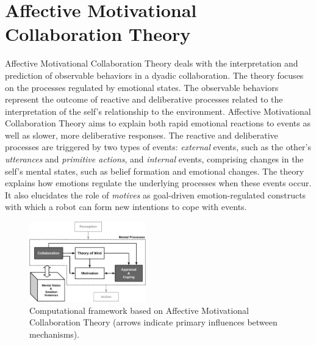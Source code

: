 \documentclass{article}
\begin{document}
\section{Affective Motivational Collaboration Theory}

Affective Motivational Collaboration Theory deals with the interpretation and
prediction of observable behaviors in a dyadic collaboration. The theory focuses
on the processes regulated by emotional states. The observable behaviors
represent the outcome of reactive and deliberative processes related to the
interpretation of the self's relationship to the environment. Affective
Motivational Collaboration Theory aims to explain both rapid emotional reactions
to events as well as slower, more deliberative responses. The reactive and
deliberative processes are triggered by two types of events: \textit{external}
events, such as the other's \textit{utterances} and \textit{primitive actions},
and \textit{internal} events, comprising changes in the self's mental states,
such as belief formation and emotional changes. The theory explains how emotions
regulate the underlying processes when these events occur. It also elucidates
the role of \textit{motives} as goal-driven emotion-regulated constructs with
which a robot can form new intentions to cope with events.

\begin{figure}[tbh]
  \centering
  \includegraphics[width=0.45\textwidth]{figure/theory-general-croped.pdf}
  \caption{{\fontsize{9}{9}\selectfont Computational framework based on
  Affective Motivational Collaboration Theory (arrows indicate primary
  influences between mechanisms).}}
  \label{fig:cpm}
\end{figure}
\end{document}
